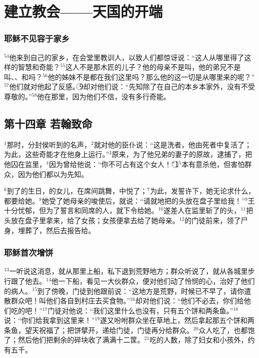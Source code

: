 \section{建立教会——天国的开端}


\subsubsection{耶稣不见容于家乡}
$^{54}$他来到自己的家乡，在会堂里教训人，以致人们都惊讶说：“这人从哪里得了这样的智慧和奇能？$^{55}$这人不是那木匠的儿子？他的母亲不是叫\UL[玛利亚]，他的弟兄不是叫\UL[雅各伯]、\UL[若瑟]、\UL[西满]和\UL[犹达]吗？$^{56}$他的姊妹不是都在我们这里吗？那么他的这一切是从哪里来的呢？”$^{57}$他们就对他起了反感。\textcircled{9}\UL[耶稣]却对他们说：“先知除了在自己的本乡本家外，没有不受尊敬的。”$^{58}$他在那里，因为他们不信，没有多行奇能。


\subsection{第十四章 若翰致命}
$^{1}$那时，分封侯\UL[黑落德]听到\UL[耶稣]的名声，$^{2}$就对他的臣仆说：“这是洗者\UL[若翰]，他由死者中复活了；为此，这些奇能才在他身上运行。”$^{3}$原来，\UL[黑落德]为了他兄弟\UL[斐理伯]的妻子\UL[黑落狄雅]的原故，逮捕了\UL[若翰]，把他囚在监里，$^{4}$因为\UL[若翰]曾给他说：“你不可占有这个女人！”\textcircled{1}$^{5}$\UL[黑落德]本有意杀他，但害怕群众，因为他们都以\UL[若翰]为先知。

$^{6}$到了\UL[黑落德]的生日，\UL[黑落狄雅]的女儿，在席间跳舞，中悦了\UL[黑落德]；$^{7}$为此，\UL[黑落德]发誓许下，她无论求什么，都要给她。$^{8}$她受了她母亲的唆使后，就说：“请就地把\UL[若翰]的头放在盘子里给我！”$^{9}$王十分忧郁，但为了誓言和同席的人，就下令给她。$^{10}$遂差人在监里斩了\UL[若翰]的头，$^{11}$把头放在盘子里拿来，给了女孩；女孩便拿去给了她母亲。$^{12}$\UL[若翰]的门徒前来，领了尸身，埋葬了，然后去报告给\UL[耶稣]。


\subsubsection{耶稣首次增饼}
$^{13}$\UL[耶稣]一听说这消息，就从那里上船，私下退到荒野地方；群众听说了，就从各城里步行跟了他去。$^{14}$他一下船，看见一大伙群众，便对他们动了怜悯的心，治好了他们的病人。$^{15}$到了傍晚，门徒到他跟前说：“这地方是荒野，时候已不早了，请你遣散群众吧！叫他们各自到村庄去买食物。”$^{16}$\UL[耶稣]却对他们说：“他们不必去，你们给他们吃的吧！”$^{17}$门徒对他说：“我们这里什么也没有，只有五个饼和两条鱼。”$^{18}$\UL[耶稣]说：“你们给我拿到这里来！”$^{19}$遂又吩咐群众坐在草地上，然后拿起那五个饼和两条鱼，望天祝福了；把饼擘开，递给门徒，门徒再分给群众。$^{20}$众人吃了，也都饱了；然后他们把剩余的碎块收了满满十二筐。$^{21}$吃的人数，除了妇女和小孩外，约有五千。



